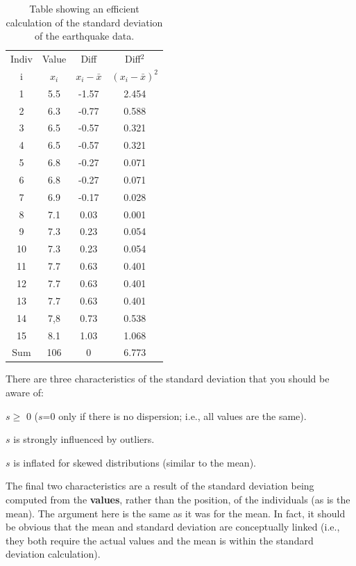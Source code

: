 \documentclass[10pt,openany]{book}\usepackage[]{graphicx}\usepackage[]{color}
\begin{document}
\begin{table}[htbp]
  \caption{Table showing an efficient calculation of the standard deviation of the earthquake data.}
  \label{tab:SDCalc}
    \centering
    \begin{tabular}{cccc}
\hline\hline
Indiv & Value & Diff & Diff$^2$ \\
i & $x_{i}$ & $x_{i}-\bar{x}$ & $(x_{i}-\bar{x})^{2}$ \\
\hline
1 & 5.5 & -1.57 & 2.454 \\
2 & 6.3 & -0.77 & 0.588 \\
3 & 6.5 & -0.57 & 0.321 \\
4 & 6.5 & -0.57 & 0.321 \\
5 & 6.8 & -0.27 & 0.071 \\
6 & 6.8 & -0.27 & 0.071 \\
7 & 6.9 & -0.17 & 0.028 \\
8 & 7.1 & 0.03 & 0.001 \\
9 & 7.3 & 0.23 & 0.054 \\
10 & 7.3 & 0.23 & 0.054 \\
11 & 7.7 & 0.63 & 0.401 \\
12 & 7.7 & 0.63 & 0.401 \\
13 & 7.7 & 0.63 & 0.401 \\
14 & 7,8 & 0.73 & 0.538 \\
15 & 8.1 & 1.03 & 1.068 \\
\hline
Sum & 106 & 0 & 6.773 \\
\hline\hline
    \end{tabular}
\end{table}


\vspace{-12pt}

There are three characteristics of the standard deviation that you should be aware of:
\vspace{-12pt}
\begin{Enumerate}
  \item $s \geq$ 0 ($s$=0 only if there is no dispersion; i.e., all values are the same).
  \item $s$ is strongly influenced by outliers.
  \item $s$ is inflated for skewed distributions (similar to the mean).
\end{Enumerate}
\vspace{-12pt}
The final two characteristics are a result of the standard deviation being computed from the \textbf{values}, rather than the position, of the individuals (as is the mean).  The argument here is the same as it was for the mean.  In fact, it should be obvious that the mean and standard deviation are conceptually linked (i.e., they both require the actual values and the mean is within the standard deviation calculation).
\end{document}
